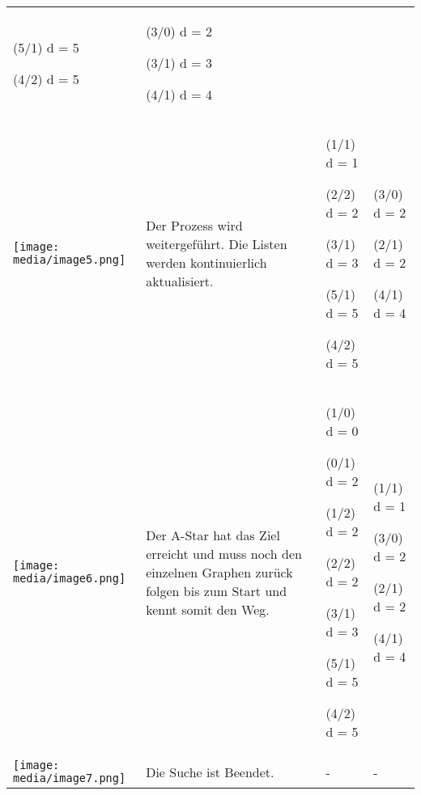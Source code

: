 \begin{longtable}[]{@{}llll@{}}
\begin{minipage}[t]{0.22\columnwidth}
(5/1) d = 5

(4/2) d = 5\strut
\end{minipage} & \begin{minipage}[t]{0.22\columnwidth}\raggedright
(3/0) d = 2

(3/1) d = 3

(4/1) d = 4\strut
\end{minipage}\tabularnewline
\begin{minipage}[t]{0.22\columnwidth}\raggedright
\texttt{[image: media/image5.png]}\strut
\end{minipage} & \begin{minipage}[t]{0.22\columnwidth}\raggedright
Der Prozess wird weitergeführt. Die Listen werden kontinuierlich
aktualisiert.\strut
\end{minipage} & \begin{minipage}[t]{0.22\columnwidth}\raggedright
(1/1) d = 1

(2/2) d = 2

(3/1) d = 3

(5/1) d = 5

(4/2) d = 5\strut
\end{minipage} & \begin{minipage}[t]{0.22\columnwidth}\raggedright
(3/0) d = 2

(2/1) d = 2

(4/1) d = 4\strut
\end{minipage}\tabularnewline
\begin{minipage}[t]{0.22\columnwidth}\raggedright
\texttt{[image: media/image6.png]}\strut
\end{minipage} & \begin{minipage}[t]{0.22\columnwidth}\raggedright
Der A-Star hat das Ziel erreicht und muss noch den einzelnen Graphen
zurück folgen bis zum Start und kennt somit den Weg.\strut
\end{minipage} & \begin{minipage}[t]{0.22\columnwidth}\raggedright
(1/0) d = 0

(0/1) d = 2

(1/2) d = 2

(2/2) d = 2

(3/1) d = 3

(5/1) d = 5

(4/2) d = 5\strut
\end{minipage} & \begin{minipage}[t]{0.22\columnwidth}\raggedright
(1/1) d = 1

(3/0) d = 2

(2/1) d = 2

(4/1) d = 4\strut
\end{minipage}\tabularnewline
\texttt{[image: media/image7.png]} &
Die Suche ist Beendet. & - & -\tabularnewline
\bottomrule
\end{longtable}

